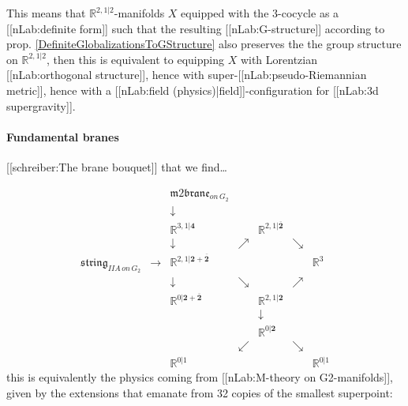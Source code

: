 \documentclass[12pt,titlepage]{article}
\newcommand{\itexarray}[1]{\begin{matrix}#1\end{matrix}}
\theoremstyle{plain}
\theoremstyle{definition}
\theoremstyle{remark}
\begin{document}
This means that $\mathbb{R}^{2,1|2}$-manifolds $X$ equipped with the 3-cocycle as a [[nLab:definite form]] such that the resulting [[nLab:G-structure]] according to prop. \ref{DefiniteGlobalizationsToGStructure} also preserves the the group structure on $\mathbb{R}^{2,1|2}$, then this is equivalent to equipping $X$ with Lorentzian [[nLab:orthogonal structure]], hence with super-[[nLab:pseudo-Riemannian metric]], hence with a [[nLab:field (physics)|field]]-configuration for [[nLab:3d supergravity]].

\hypertarget{fundamental_branes}{}\paragraph*{{Fundamental branes}}\label{fundamental_branes}

[[schreiber:The brane bouquet]] that we find\ldots{}

\begin{displaymath}
\itexarray{
     && \mathfrak{m}2\mathfrak{brane}_{on\,G_2}
     \\
     && \downarrow
     \\
     && \mathbb{R}^{3,1|\mathbf{4}}  &&  \mathbb{R}^{2,1|\overline{\mathbf{2}}}
     \\
     && \downarrow & \nearrow&  & \searrow
     \\
     \mathfrak{string}_{IIA\,on\,G_2} &\longrightarrow& \mathbb{R}^{2,1|\mathbf{2}+\overline{\mathbf{2}}} &&  && \mathbb{R}^{3}
     \\
     && \downarrow &\searrow&  & \nearrow
     \\
     && \mathbb{R}^{0|\mathbf{2}+\overline{\mathbf{2}}} &&  \mathbb{R}^{2,1|\mathbf{2}}
     \\
     && && \downarrow
     \\
     && && \mathbb{R}^{0|\mathbf{2}}
     \\
     && & \swarrow && \searrow
     \\
     && \mathbb{R}^{0|1} && && \mathbb{R}^{0|1}
  }
\end{displaymath}
this is equivalently the physics coming from [[nLab:M-theory on G2-manifolds]], given by the extensions that emanate from 32 copies of the smallest superpoint:
\end{document}
